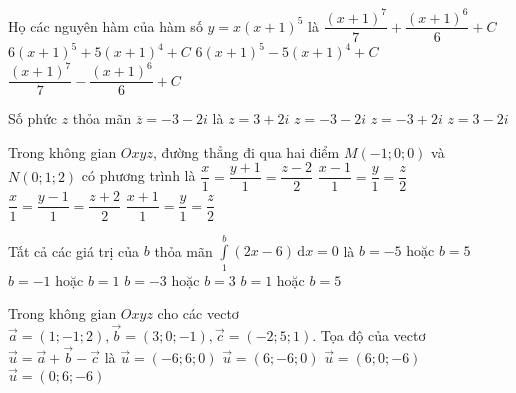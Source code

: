 \begin{ex}%
	Họ các nguyên hàm của hàm số $y=x(x+1)^5$ là
	\choice
	{$\dfrac{(x+1)^7}{7}+\dfrac{(x+1)^6}{6}+C$}
	{$6(x+1)^5+5(x+1)^4+C$}
	{$6(x+1)^5-5(x+1)^4+C$}
	{\True $\dfrac{(x+1)^7}{7}-\dfrac{(x+1)^6}{6}+C$}
\end{ex}
\begin{ex}%
	Số phức $z$ thỏa mãn $\overline{z}=-3-2i$ là 
	\choice
	{$z=3+2i$}
	{$z=-3-2i$}
	{\True $z=-3+2i$}
	{$z=3-2i$}
\end{ex}
\begin{ex}%
	Trong không gian $Oxyz$, đường thẳng đi qua hai điểm $M(-1;0;0)$ và $N(0;1;2)$ có phương trình là
	\choice
	{$\dfrac{x}{1}=\dfrac{y+1}{1}=\dfrac{z-2}{2}$}
	{$\dfrac{x-1}{1}=\dfrac{y}{1}=\dfrac{z}{2}$}
	{$\dfrac{x}{1}=\dfrac{y-1}{1}=\dfrac{z+2}{2}$}
	{\True$\dfrac{x+1}{1}=\dfrac{y}{1}=\dfrac{z}{2}$}
\end{ex}
\begin{ex}%
	Tất cả các giá trị của $b$ thỏa mãn 
	$\displaystyle\int\limits_1^b (2x-6)\mathrm{\,d}x=0$ là
	\choice
	{$b=-5$ hoặc $b=5$}
	{$b=-1$ hoặc $b=1$}
	{$b=-3$ hoặc $b=3$}
	{\True $b=1$ hoặc $b=5$}
\end{ex}
\begin{ex}%
	Trong không gian $Oxyz$ cho các vectơ $\vec{a}=(1;-1;2),\vec{b}=(3;0;-1),\vec{c}=(-2;5;1)$. Tọa độ của vectơ $\vec{u}=\vec{a}+\vec{b}-\vec{c}$ là
	\choice
	{$\vec{u}=(-6;6;0)$}
	{\True $\vec{u}=(6;-6;0)$}
	{$\vec{u}=(6;0;-6)$}
	{$\vec{u}=(0;6;-6)$}
\end{ex}
